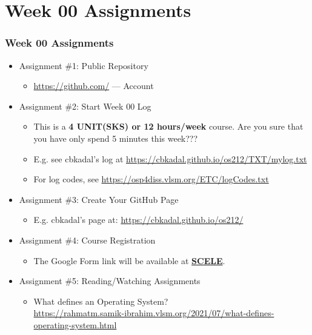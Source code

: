 \documentclass[xcolor=table, notheorems, hyperref={pdfpagelabels=false}]{beamer}
\begin{document}
\section{Week 00 Assignments}
\begin{frame}[fragile]
\frametitle{Week 00 Assignments}
\begin{itemize}
\item Assignment \#1: Public Repository
\begin{itemize}
\item \url{https://github.com/} --- Account
\end{itemize}
\item Assignment \#2: Start Week 00 Log
\begin{itemize}
\item This is a \textbf{4 UNIT(SKS) or 12 hours/week} course. Are you sure that you have only spend 5 minutes this week???
\item E.g. see cbkadal's log at \url{https://cbkadal.github.io/os212/TXT/mylog.txt}
\item For log codes, see \url{https://osp4diss.vlsm.org/ETC/logCodes.txt}
\end{itemize}
\item Assignment \#3: Create Your GitHub Page
\begin{itemize}
\item E.g. cbkadal's page at: \url{https://cbkadal.github.io/os212/}
\end{itemize}
\item Assignment \#4: Course Registration
\begin{itemize}
\item The Google Form link will be available at
\href{https://scele.cs.ui.ac.id/mod/forum/discuss.php?d=30285}{\textbf{SCELE}}.
\end{itemize}
\item Assignment \#5: Reading/Watching Assignments
\begin{itemize}
\item What defines an Operating System?\\ \url{https://rahmatm.samik-ibrahim.vlsm.org/2021/07/what-defines-operating-system.html}
\end{itemize}
\end{itemize}
\end{frame}

\end{document}
